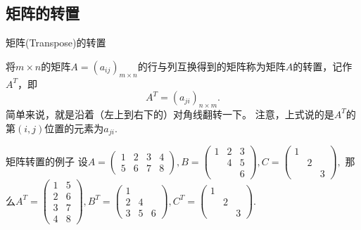 
\subsection{矩阵的转置}


\begin{frame}{矩阵(Transpose)的转置}

将$m\times n$的矩阵$A = (a_{ij})_{m\times n}$的行与列互换得到的矩阵称为矩阵$A$的转置，记作$A^T$，即
\[A^T = (a_{ji})_{n\times m}.\]
简单来说，就是沿着（左上到右下的）对角线翻转一下。{\color{red} 注意}，上式说的是$A^T$的第$(i,j)$位置的元素为$a_{ji}$.

\pause

\begin{block}{矩阵转置的例子}
设\(\displaystyle A = \begin{pmatrix}
1 & 2 & 3 & 4 \\ 5 & 6 & 7 & 8 \end{pmatrix}, B = \begin{pmatrix}
1 & 2 & 3 \\ & 4 & 5 \\ & & 6 \end{pmatrix}, C = \begin{pmatrix}
1 & & \\ & 2 & \\ & & 3 \end{pmatrix},\) \newline \pause
那么\(\displaystyle A^T = \begin{pmatrix}
1 & 5 \\ 2 & 6 \\ 3 & 7 \\ 4 & 8 \end{pmatrix}, B^T = \begin{pmatrix}
1 & & \\ 2 & 4 & \\ 3 & 5 & 6 \end{pmatrix}, C^T = \begin{pmatrix}
1 & & \\ & 2 & \\ & & 3 \end{pmatrix}.\)
\end{block}

\end{frame}


